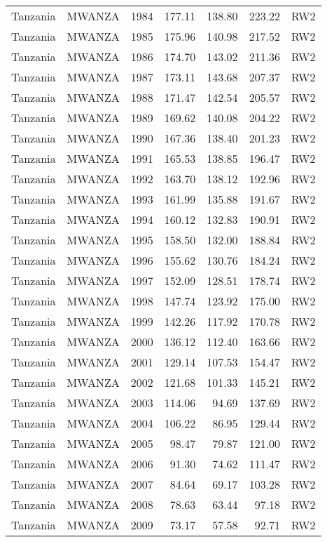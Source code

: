\begin{longtable}{lllrrrl}
  Tanzania & MWANZA & 1984 & 177.11 & 138.80 & 223.22 & RW2 \\ 
  Tanzania & MWANZA & 1985 & 175.96 & 140.98 & 217.52 & RW2 \\ 
  Tanzania & MWANZA & 1986 & 174.70 & 143.02 & 211.36 & RW2 \\ 
  Tanzania & MWANZA & 1987 & 173.11 & 143.68 & 207.37 & RW2 \\ 
  Tanzania & MWANZA & 1988 & 171.47 & 142.54 & 205.57 & RW2 \\ 
  Tanzania & MWANZA & 1989 & 169.62 & 140.08 & 204.22 & RW2 \\ 
  Tanzania & MWANZA & 1990 & 167.36 & 138.40 & 201.23 & RW2 \\ 
  Tanzania & MWANZA & 1991 & 165.53 & 138.85 & 196.47 & RW2 \\ 
  Tanzania & MWANZA & 1992 & 163.70 & 138.12 & 192.96 & RW2 \\ 
  Tanzania & MWANZA & 1993 & 161.99 & 135.88 & 191.67 & RW2 \\ 
  Tanzania & MWANZA & 1994 & 160.12 & 132.83 & 190.91 & RW2 \\ 
  Tanzania & MWANZA & 1995 & 158.50 & 132.00 & 188.84 & RW2 \\ 
  Tanzania & MWANZA & 1996 & 155.62 & 130.76 & 184.24 & RW2 \\ 
  Tanzania & MWANZA & 1997 & 152.09 & 128.51 & 178.74 & RW2 \\ 
  Tanzania & MWANZA & 1998 & 147.74 & 123.92 & 175.00 & RW2 \\ 
  Tanzania & MWANZA & 1999 & 142.26 & 117.92 & 170.78 & RW2 \\ 
  Tanzania & MWANZA & 2000 & 136.12 & 112.40 & 163.66 & RW2 \\ 
  Tanzania & MWANZA & 2001 & 129.14 & 107.53 & 154.47 & RW2 \\ 
  Tanzania & MWANZA & 2002 & 121.68 & 101.33 & 145.21 & RW2 \\ 
  Tanzania & MWANZA & 2003 & 114.06 & 94.69 & 137.69 & RW2 \\ 
  Tanzania & MWANZA & 2004 & 106.22 & 86.95 & 129.44 & RW2 \\ 
  Tanzania & MWANZA & 2005 & 98.47 & 79.87 & 121.00 & RW2 \\ 
  Tanzania & MWANZA & 2006 & 91.30 & 74.62 & 111.47 & RW2 \\ 
  Tanzania & MWANZA & 2007 & 84.64 & 69.17 & 103.28 & RW2 \\ 
  Tanzania & MWANZA & 2008 & 78.63 & 63.44 & 97.18 & RW2 \\ 
  Tanzania & MWANZA & 2009 & 73.17 & 57.58 & 92.71 & RW2 \\ 

\end{longtable}
